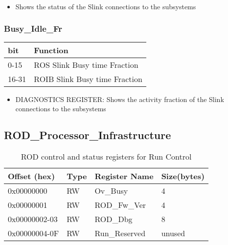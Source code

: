 \begin{itemize}
\item Shows the status of the Slink connections to the subsystems
\end{itemize}




\subsubsection{Busy\_Idle\_Fr}

\begin {table}[H]
\begin{center}
\begin{tabular}{|l|l|}
\hline
\textbf{bit} & \textbf{Function} \\
\hline
0-15 & ROS Slink Busy time Fraction \\
\hline
16-31 & ROIB Slink Busy time Fraction \\
\hline
\end{tabular}
\end{center}
\end{table}


\begin{itemize}
\item DIAGNOSTICS REGISTER: Shows the activity fraction of the Slink connections to the subsystems
\end{itemize}








\subsection{ROD\_Processor\_Infrastructure}
%
\begin {table}[H]
\begin{center}
\caption {ROD control and status registers for Run Control}
\label{rod_control_run}
\begin{tabular}{|l|l|l|l|}
\hline
Offset (hex)& Type & Register Name & Size(bytes)\\
\hline
0x00000000 & RW & Ov\_Busy & 4 \\
\hline
0x00000001 & RW & ROD\_Fw\_Ver & 4 \\
\hline
0x00000002-03 & RW & ROD\_Dbg & 8 \\
\hline
0x00000004-0F & RW & Run\_Reserved & unused \\
\hline
\end{tabular}
\end{center}
\end{table}



